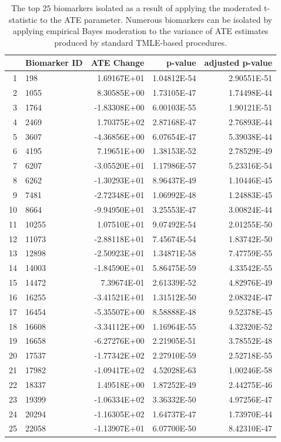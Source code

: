 \begin{table}[H]
\centering
\label{table:topresults}
\begin{tabular}{rlrrr}
  \hline
  & Biomarker ID & ATE Change & p-value & adjusted p-value \\
  \hline
  1 & 198 & 1.69167E+01 & 1.04812E-54 & 2.90551E-51 \\
  2 & 1055 & 8.30585E+00 & 1.73105E-47 & 1.74498E-44 \\
  3 & 1764 & -1.83308E+00 & 6.00103E-55 & 1.90121E-51 \\
  4 & 2469 & 1.70375E+02 & 2.87168E-47 & 2.76893E-44 \\
  5 & 3607 & -4.36856E+00 & 6.07654E-47 & 5.39038E-44 \\
  6 & 4195 & 7.19651E+00 & 1.38153E-52 & 2.78529E-49 \\
  7 & 6207 & -3.05520E+01 & 1.17986E-57 & 5.23316E-54 \\
  8 & 6262 & -1.30293E+01 & 8.96437E-49 & 1.10446E-45 \\
  9 & 7481 & -2.72348E+01 & 1.06992E-48 & 1.24883E-45 \\
  10 & 8664 & -9.94950E+01 & 3.25553E-47 & 3.00824E-44 \\
  11 & 10255 & 1.07510E+01 & 9.07492E-54 & 2.01255E-50 \\
  12 & 11073 & -2.88118E+01 & 7.45674E-54 & 1.83742E-50 \\
  13 & 12898 & -2.50923E+01 & 1.34871E-58 & 7.47759E-55 \\
  14 & 14003 & -1.84590E+01 & 5.86475E-59 & 4.33542E-55 \\
  15 & 14472 & 7.39674E-01 & 2.61339E-52 & 4.82976E-49 \\
  16 & 16255 & -3.41521E+01 & 1.31512E-50 & 2.08324E-47 \\
  17 & 16454 & -5.35507E+00 & 8.58888E-48 & 9.52378E-45 \\
  18 & 16608 & -3.34112E+00 & 1.16964E-55 & 4.32320E-52 \\
  19 & 16658 & -6.27276E+00 & 2.21905E-51 & 3.78552E-48 \\
  20 & 17537 & -1.77342E+02 & 2.27910E-59 & 2.52718E-55 \\
  21 & 17982 & -1.09417E+02 & 4.52028E-63 & 1.00246E-58 \\
  22 & 18337 & 1.49518E+00 & 1.87252E-49 & 2.44275E-46 \\
  23 & 19399 & -1.06334E+02 & 3.36332E-50 & 4.97256E-47 \\
  24 & 20294 & -1.16305E+02 & 1.64737E-47 & 1.73970E-44 \\
  25 & 22058 & -1.13907E+01 & 6.07700E-50 & 8.42310E-47 \\
  \hline
\end{tabular}
\caption{The top $25$ biomarkers isolated as a result of applying the moderated
  t-statistic to the ATE parameter. Numerous biomarkers can be isolated by
  applying empirical Bayes moderation to the variance of ATE estimates produced
  by standard TMLE-based procedures.}
\end{table}

